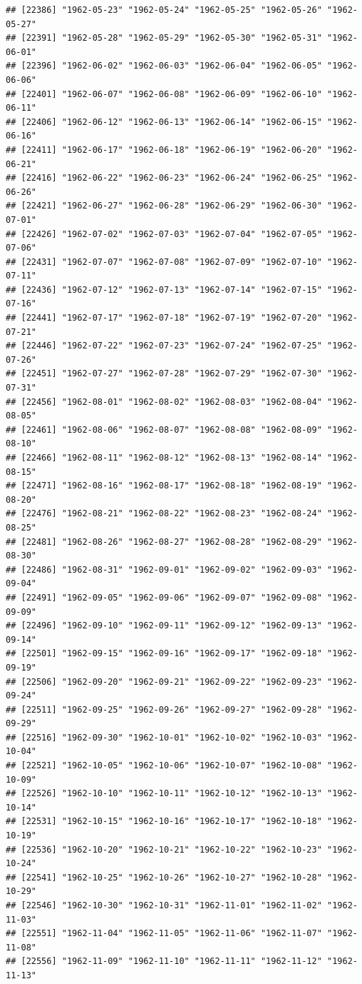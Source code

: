 \documentclass{article}\usepackage[]{graphicx}\usepackage[]{color}
\makeatletter
\newenvironment{kframe}{%
 \def\at@end@of@kframe{}%
 \ifinner\ifhmode%
  \def\at@end@of@kframe{\end{minipage}}%
  \begin{minipage}{\columnwidth}%
 \fi\fi%
 \def\FrameCommand##1{\hskip\@totalleftmargin \hskip-\fboxsep
 \colorbox{shadecolor}{##1}\hskip-\fboxsep
     \hskip-\linewidth \hskip-\@totalleftmargin \hskip\columnwidth}%
 \MakeFramed {\advance\hsize-\width
   \@totalleftmargin\z@ \linewidth\hsize
   \@setminipage}}%
 {\par\unskip\endMakeFramed%
 \at@end@of@kframe}
\newenvironment{knitrout}{}{} %
\makeatother
\begin{document}
\begin{description}
\begin{knitrout}
\begin{kframe}
\begin{verbatim}
## [22386] "1962-05-23" "1962-05-24" "1962-05-25" "1962-05-26" "1962-05-27"
## [22391] "1962-05-28" "1962-05-29" "1962-05-30" "1962-05-31" "1962-06-01"
## [22396] "1962-06-02" "1962-06-03" "1962-06-04" "1962-06-05" "1962-06-06"
## [22401] "1962-06-07" "1962-06-08" "1962-06-09" "1962-06-10" "1962-06-11"
## [22406] "1962-06-12" "1962-06-13" "1962-06-14" "1962-06-15" "1962-06-16"
## [22411] "1962-06-17" "1962-06-18" "1962-06-19" "1962-06-20" "1962-06-21"
## [22416] "1962-06-22" "1962-06-23" "1962-06-24" "1962-06-25" "1962-06-26"
## [22421] "1962-06-27" "1962-06-28" "1962-06-29" "1962-06-30" "1962-07-01"
## [22426] "1962-07-02" "1962-07-03" "1962-07-04" "1962-07-05" "1962-07-06"
## [22431] "1962-07-07" "1962-07-08" "1962-07-09" "1962-07-10" "1962-07-11"
## [22436] "1962-07-12" "1962-07-13" "1962-07-14" "1962-07-15" "1962-07-16"
## [22441] "1962-07-17" "1962-07-18" "1962-07-19" "1962-07-20" "1962-07-21"
## [22446] "1962-07-22" "1962-07-23" "1962-07-24" "1962-07-25" "1962-07-26"
## [22451] "1962-07-27" "1962-07-28" "1962-07-29" "1962-07-30" "1962-07-31"
## [22456] "1962-08-01" "1962-08-02" "1962-08-03" "1962-08-04" "1962-08-05"
## [22461] "1962-08-06" "1962-08-07" "1962-08-08" "1962-08-09" "1962-08-10"
## [22466] "1962-08-11" "1962-08-12" "1962-08-13" "1962-08-14" "1962-08-15"
## [22471] "1962-08-16" "1962-08-17" "1962-08-18" "1962-08-19" "1962-08-20"
## [22476] "1962-08-21" "1962-08-22" "1962-08-23" "1962-08-24" "1962-08-25"
## [22481] "1962-08-26" "1962-08-27" "1962-08-28" "1962-08-29" "1962-08-30"
## [22486] "1962-08-31" "1962-09-01" "1962-09-02" "1962-09-03" "1962-09-04"
## [22491] "1962-09-05" "1962-09-06" "1962-09-07" "1962-09-08" "1962-09-09"
## [22496] "1962-09-10" "1962-09-11" "1962-09-12" "1962-09-13" "1962-09-14"
## [22501] "1962-09-15" "1962-09-16" "1962-09-17" "1962-09-18" "1962-09-19"
## [22506] "1962-09-20" "1962-09-21" "1962-09-22" "1962-09-23" "1962-09-24"
## [22511] "1962-09-25" "1962-09-26" "1962-09-27" "1962-09-28" "1962-09-29"
## [22516] "1962-09-30" "1962-10-01" "1962-10-02" "1962-10-03" "1962-10-04"
## [22521] "1962-10-05" "1962-10-06" "1962-10-07" "1962-10-08" "1962-10-09"
## [22526] "1962-10-10" "1962-10-11" "1962-10-12" "1962-10-13" "1962-10-14"
## [22531] "1962-10-15" "1962-10-16" "1962-10-17" "1962-10-18" "1962-10-19"
## [22536] "1962-10-20" "1962-10-21" "1962-10-22" "1962-10-23" "1962-10-24"
## [22541] "1962-10-25" "1962-10-26" "1962-10-27" "1962-10-28" "1962-10-29"
## [22546] "1962-10-30" "1962-10-31" "1962-11-01" "1962-11-02" "1962-11-03"
## [22551] "1962-11-04" "1962-11-05" "1962-11-06" "1962-11-07" "1962-11-08"
## [22556] "1962-11-09" "1962-11-10" "1962-11-11" "1962-11-12" "1962-11-13"

\end{verbatim}
\end{kframe}
\end{knitrout}
\end{description}
\end{document}
